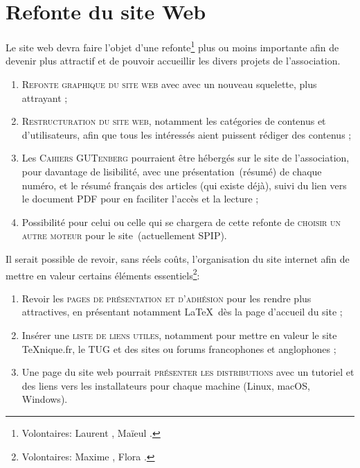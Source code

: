 \documentclass{tufte-handout}
\newcommand{\ratio}[3][]{\marginpar{\footnotesize{\textcolor{teal}{Temps requis: #2 / Utilité: #3}\par\noindent \textcolor{teal}{#1}}}}
\begin{document}
{\section{Refonte du site Web}

Le site web devra faire l'objet d'une refonte\ratio[Travail intense, mais
limité dans le temps.]{+++}{+++}\footnote{Volontaires: Laurent ,
  Maïeul .} plus ou moins importante afin de devenir plus
attractif et de pouvoir accueillir les divers projets de l'association.

\begin{enumerate}
\item\textsc{Refonte graphique du site web} avec avec un nouveau squelette,
  plus attrayant ;
\item\textsc{Restructuration du site web}, notamment les catégories de
  contenus et d'utilisateurs, afin que tous les intéressés aient puissent
  rédiger des contenus ;
\item Les \textsc{Cahiers GUTenberg} pourraient être hébergés sur le site de
  l'association, pour davantage de lisibilité, avec une présentation~(résumé)
  de chaque numéro, et le résumé français des articles (qui existe déjà),
  suivi du lien vers le document PDF pour en faciliter l'accès et la lecture ;
\item Possibilité pour celui ou celle qui se chargera de cette refonte de
  \textsc{choisir un autre moteur} pour le site~(actuellement SPIP).
\end{enumerate}

Il serait possible de revoir, sans réels coûts\ratio[Travail limité dans le
temps]{+}{+++}, l'organisation du site internet afin de mettre en valeur
certains éléments essentiels\footnote{Volontaires: Maxime , Flora
  .}:

\begin{enumerate}
\item Revoir les \textsc{pages de présentation et d'adhésion} pour les rendre
  plus attractives, en présentant notamment \LaTeX\ dès la page d'accueil du
  site ;
\item Insérer une \textsc{liste de liens utiles}, notamment pour mettre en
  valeur le site \TeX nique.fr, le TUG et des sites ou forums francophones et
  anglophones ;
\item Une page du site web pourrait \textsc{présenter les distributions} avec
  un tutoriel et des liens vers les installateurs pour chaque machine (Linux,
  macOS, Windows).
\end{enumerate}

}
\end{document}

